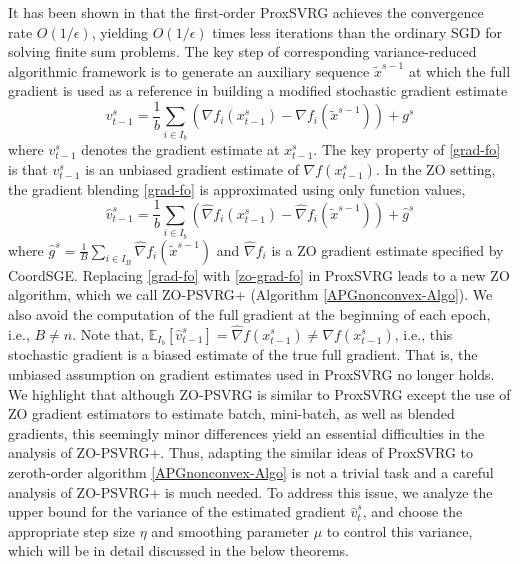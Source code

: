 \documentclass{article}
\newcommand*{\E}{\mathbb{E}}
\theoremstyle{definition}
\theoremstyle{remark}
\begin{document}
{\color{Green}
 {\color{Brown}It has been shown in \cite{johnson2013accelerating,reddi2016stochastic,li2018simple} that the first-order ProxSVRG achieves the convergence rate $O(1/\epsilon )$, yielding $O(1/\epsilon)$ times less iterations than the ordinary SGD for solving finite sum problems.}
{\color{Green}
{\color{Brown} The key step of corresponding variance-reduced algorithmic framework is to generate an auxiliary sequence $\tilde{x}^{s-1}$ at which the full gradient is used as a reference in building a modified stochastic gradient estimate 
\begin{equation}\label{grad-fo}
{{v}}_{t-1}^s = \frac{1}{b} \sum_{i\in I_b}\left({\nabla} f_{i}(x_{t-1}^s)-{\nabla} f_{i}(\tilde{x}^{s-1})\right)+{g}^s
\end{equation}
where ${{v}}_{t-1}^s$ denotes the gradient estimate at $x_{t-1}^s$. The key property of \eqref{grad-fo} is that ${{v}}_{t-1}^s$ is an unbiased gradient estimate of $\nabla f(x_{t-1}^s)$. In the ZO setting, the gradient blending \eqref{grad-fo} is approximated using only function values,
\begin{equation}\label{zo-grad-fo}
{\hat{v}}_{t-1}^s = \frac{1}{b} \sum_{i\in I_b}\left(\hat{\nabla} f_{i}(x_{t-1}^s)-\hat{\nabla} f_{i}(\tilde{x}^{s-1})\right)+\hat{g}^s
\end{equation}
where $\hat{g}^s= \frac{1}{B}\sum_{i\in I_B}\hat{\nabla} f_{i}(\tilde{x}^{s-1})$ and $\hat{\nabla} f_{i}$ is a ZO gradient estimate specified by CoordSGE.  Replacing \eqref{grad-fo} with \eqref{zo-grad-fo} in ProxSVRG leads to a new ZO
algorithm, which we call ZO-PSVRG+ (Algorithm \ref{APGnonconvex-Algo}). We also avoid the computation of the full gradient at the beginning of each epoch, i.e., $B \neq n$.
}
Note that, $\E_{I_b}[\hat{v}_{t-1}^s] = \hat{\nabla} f(x_{t-1}^s) \neq {\nabla} f(x_{t-1}^s)$, i.e., this stochastic gradient is a biased estimate of the true full gradient.
{\color{Brown} That is, the unbiased assumption on gradient estimates used in ProxSVRG \cite{reddi2016proximal,li2018simple} no longer holds. We highlight that although ZO-PSVRG is similar
to ProxSVRG except the use of ZO gradient estimators to estimate batch, mini-batch, as well as blended
gradients, this seemingly minor differences yield an essential difficulties in the analysis of ZO-PSVRG+.
}
Thus, adapting the similar ideas of ProxSVRG to zeroth-order algorithm \ref{APGnonconvex-Algo} is not a trivial task {\color{Brown} and a careful analysis of ZO-PSVRG+ is much needed.} To address this issue, we analyze the upper bound for the variance of the estimated gradient $\hat{v}_t^s$, and choose the appropriate step size $\eta$ and smoothing parameter $\mu$ to control
this variance, which will be in detail discussed in the below theorems.
}
}
\end{document}
